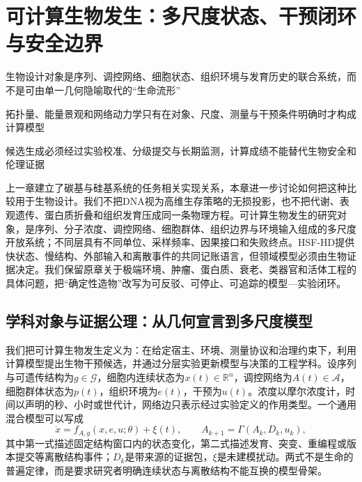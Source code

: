 \chapter{可计算生物发生：多尺度状态、干预闭环与安全边界}
\label{chp:topological_biogenesis}

\begin{introduction}
    \item 生物设计对象是序列、调控网络、细胞状态、组织环境与发育历史的联合系统，而不是可由单一几何隐喻取代的“生命流形”
    \item 拓扑量、能量景观和网络动力学只有在对象、尺度、测量与干预条件明确时才构成计算模型
    \item 候选生成必须经过实验校准、分级提交与长期监测，计算成绩不能替代生物安全和伦理证据
\end{introduction}

上一章建立了碳基与硅基系统的任务相关实现关系，本章进一步讨论如何把这种比较用于生物设计。我们不把DNA视为高维生存策略的无损投影，也不把代谢、表观遗传、蛋白质折叠和组织发育压成同一条物理方程。可计算生物发生的研究对象，是序列、分子浓度、调控网络、细胞群体、组织边界与环境输入组成的多尺度开放系统；不同层具有不同单位、采样频率、因果接口和失败终点。HSF-HD提供快状态、慢结构、外部输入和离散事件的共同记账语言，但领域模型必须由生物证据决定。我们保留原章关于极端环境、肿瘤、蛋白质、衰老、类器官和活体工程的具体问题，把“确定性造物”改写为可反驳、可停止、可追踪的模型—实验闭环。

\section{学科对象与证据公理：从几何宣言到多尺度模型}
\label{sec:tb_axioms}

我们把可计算生物发生定义为：在给定宿主、环境、测量协议和治理约束下，利用计算模型提出生物干预候选，并通过分层实验更新模型与决策的工程学科。设序列与可遗传结构为$g\in\mathcal G$，细胞内连续状态为$x(t)\in\mathbb R^n$，调控网络为$A(t)\in\mathcal A$，细胞群体状态为$p(t)$，组织环境为$e(t)$，干预为$u(t)$。浓度以摩尔浓度计，时间以声明的秒、小时或世代计，网络边只表示经过实验定义的作用类型。一个通用混合模型可以写成
\begin{equation}
 \dot x=f_{A,g}(x,e,u;\theta)+\xi(t),\qquad
 A_{k+1}=\Gamma(A_k,D_k,u_k),
\end{equation}
其中第一式描述固定结构窗口内的状态变化，第二式描述发育、突变、重编程或版本提交等离散结构事件；$D_k$是带来源的证据包，$\xi$是未建模扰动。两式不是生命的普遍定律，而是要求研究者明确连续状态与离散结构不能互换的模型骨架。

